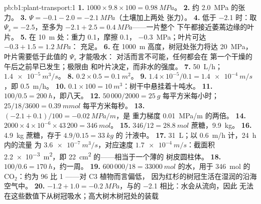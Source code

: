 \begin{solution}{pb:b1:plant-transport:1}
\textbf{1.} $1000\times 9.8\times 100 = \qty{0.98}{MPa}$。
\textbf{2.} 约 \qty{2.0}{MPa} 的张力。
\textbf{3.} $\Psi = -0.1 - 2.0 = \qty{-2.1}{MPa}$（土壤加上两处
张力）。
\textbf{4.} 低于 \qty{-2.1}{} 时：取 $\Psi_s = -2.5$，至多为
$-2.1 + 2.5 = \qty{0.4}{MPa}$——一片整个
下午都接近萎蔫边缘的叶片。
\textbf{5.} 在 \qty{10}{m} 处：重力 \qty{0.1}{}，摩擦 \qty{0.1}{}，
 \qty{-0.3}{MPa}；叶片可达 $-0.3 + 1.5 = \qty{1.2}{MPa}$：
充足。
\textbf{6.} 在 \qty{1000}{m} 高度，树冠处张力将达 \qty{20}{MPa}，
叶片需要低于此值的 $\Psi_s$ 才能吸水：
对活而言不可能，任何都会在
第一个干燥的午后之前早已发生；极限由
和叶片决定，而非水的强度。
\textbf{7.} \qty{50}{L/h}；$\qty{1.4e-5}{m^3/s}$。
\textbf{8.} $0.2\times 0.5 = \qty{0.1}{m^2}$。
\textbf{9.} $1.4\times 10^{-5}/0.1 = \qty{1.4e-4}{m/s}$，即 \qty{0.5}{m/h}。
\textbf{10.} $0.1\times 100 = \qty{10}{m^3}$：树干中悬挂着十吨水。
\textbf{11.} $100/0.5 = \qty{200}{h}$，即八天。
\textbf{12.} $50\,000/2000 = \qty{25}{g}$ 每平方米每小时；
$25/18/3600 = \qty{0.39}{mmol}$ 每平方米每秒。
\textbf{13.} $(-2.1 + 0.1)/100 = \qty{-0.02}{MPa/m}$，是
重力梯度 \qty{0.01}{MPa/m} 的两倍。
\textbf{14.} $2000\times 4\times 10^{-6}\times 43\,200 = \qty{346}{mol}$。
\textbf{15.} $346/12 = \qty{28.8}{mol}$ 蔗糖，\qty{9.9}{kg}。
\textbf{16.} \qty{4.9}{kg} 蔗糖，存于 $4.9/0.15 = \qty{33}{kg}$ 的
汁液中。
\textbf{17.} \qty{31}{L}；以 \qty{0.6}{m/h} 计，\qty{24}{h} 内的流量
为 $\qty{3.6e-7}{m^3/s}$，对应速度 $\qty{1.7e-4}{m/s}$：截面积
\qty{2.2e-3}{m^2}，即 \qty{22}{cm^2} 的——相当于一个薄的
树皮圆柱体。
\textbf{18.} $100/0.6 = \qty{170}{h}$，约一周。
\textbf{19.} $600\,000/18 = \qty{33000}{mol}$ 的水，用于
\qty{346}{mol} 的 $\mathrm{CO_2}$：约为 96 比 1 ——对 C3 植物而言偏低，
因为红杉的树冠生活在湿润的沿海空气中。
\textbf{20.} $-1.2 + 1.0 = \qty{-0.2}{MPa}$，与的
\qty{-2.1}{} 相比：水会从流向，因此
无法在这些数值下从树冠吸水；高大树木树冠处的装载

\end{solution}
